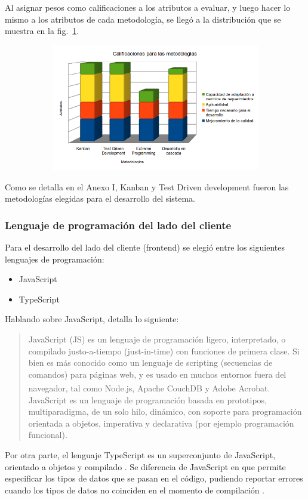 \documentclass[twoside]{article}
\begin{document}
Al asignar pesos como calificaciones a los atributos a evaluar, y luego hacer lo mismo a los atributos de cada metodología, se llegó a la distribución que se muestra en la fig.~\ref{fig:metodologias}.
\begin{figure}[H]
	\caption{Gráfico de calificaciones para metodologías}
    \begin{subfigure}{1\textwidth}
	\includegraphics[width=1\textwidth]{calificaciones para metodologias.png}
    \end{subfigure}
	\label{fig:metodologias}
\end{figure}
\vspace{-1.0\baselineskip}
Como se detalla en el Anexo I, Kanban y Test Driven development fueron las metodologías elegidas para el desarrollo del sistema.
\subsubsection{Lenguaje de programación del lado del cliente}
Para el desarrollo del lado del cliente (frontend) se elegió entre los siguientes lenguajes de programación:
\begin{itemize}
    \item JavaScript
    \item TypeScript
\end{itemize}
Hablando sobre JavaScript, \textcite{mdnJs} detalla lo siguiente:
\blockquote{JavaScript (JS) es un lenguaje de programación ligero, interpretado, o compilado justo-a-tiempo (just-in-time) con funciones de primera clase. Si bien es más conocido como un lenguaje de scripting (secuencias de comandos) para páginas web, y es usado en muchos entornos fuera del navegador, tal como Node.js\textsuperscript{\textregistered}, Apache CouchDB y Adobe Acrobat. JavaScript es un lenguaje de programación basada en prototipos, multiparadigma, de un solo hilo, dinámico, con soporte para programación orientada a objetos, imperativa y declarativa (por ejemplo programación funcional).}
Por otra parte, el lenguaje TypeScript es un superconjunto de JavaScript, orientado a objetos y compilado \parencite{msTs}. Se diferencia de JavaScript en que permite especificar los tipos de datos que se pasan en el código, pudiendo reportar errores cuando los tipos de datos no coinciden en el momento de compilación \parencite{w3schoolsTs}. 
\end{document}
